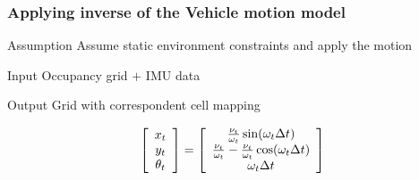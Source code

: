 \documentclass{beamer}
\begin{document}
	\begin{frame}
		\frametitle{Applying inverse of the Vehicle motion model}
		
		\begin{block}{Assumption}		
		Assume static environment constraints and apply the motion
		\end{block}		
		
		\begin{exampleblock}{Input}		
		Occupancy grid $+$ IMU data
		\end{exampleblock}

		\begin{alertblock}{Output}		
		Grid with correspondent cell mapping
		\end{alertblock}

		\begin{equation}
		\left[\begin{array}{c}x_t \\ y_t\\ \theta_t \end{array} \right] = 
		\left[\begin{array}{c} {\nu_t \over \omega_t} \sin(\omega_t \Delta t) \\ {\nu_t \over \omega_t} - {\nu_t \over \omega_t} \cos(\omega_t \Delta t) \\ \omega_t \Delta t \end{array}\right]
		\label{eq:circularmotion}
		\end{equation}
	\end{frame}	
\end{document}
